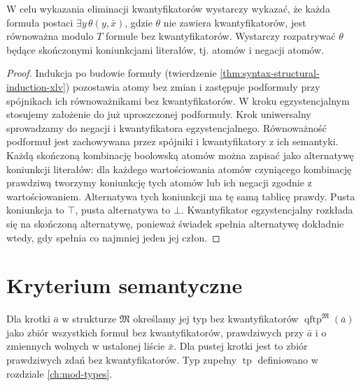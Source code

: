 \begin{lemat}
\label{lem:mod-qe-exists}
W celu wykazania eliminacji kwantyfikatorów wystarczy
wykazać, że każda formuła postaci $\exists y\,\theta(y,\bar x)$,
gdzie $\theta$ nie zawiera kwantyfikatorów, jest równoważna
modulo $T$ formule bez kwantyfikatorów.
Wystarczy rozpatrywać $\theta$ będące skończonymi
koniunkcjami literałów, tj. atomów i negacji atomów.
\end{lemat}
\begin{proof}
Indukcja po budowie formuły (twierdzenie
\ref{thm:syntax-structural-induction-xlv}) pozostawia atomy
bez zmian i zastępuje podformuły przy spójnikach ich
równoważnikami bez kwantyfikatorów. W kroku egzystencjalnym
stosujemy założenie do już uproszczonej podformuły.
Krok uniwersalny sprowadzamy do negacji i kwantyfikatora
egzystencjalnego. Równoważność podformuł jest zachowywana
przez spójniki i kwantyfikatory z ich semantyki.
Każdą skończoną kombinację boolowską atomów można
zapisać jako alternatywę koniunkcji literałów: dla każdego
wartościowania atomów czyniącego kombinację prawdziwą
tworzymy koniunkcję tych atomów lub ich negacji zgodnie
z wartościowaniem. Alternatywa tych koniunkcji ma tę samą
tablicę prawdy. Pusta koniunkcja to $\top$, pusta
alternatywa to $\bot$. Kwantyfikator egzystencjalny
rozkłada się na skończoną alternatywę, ponieważ świadek
spełnia alternatywę dokładnie wtedy, gdy spełnia
co najmniej jeden jej człon.
\end{proof}

\section{Kryterium semantyczne}
\begin{definicja}
\label{def:mod-qe-qftype}
Dla krotki $\bar a$ w strukturze $\mathfrak M$ określamy
jej typ bez kwantyfikatorów
$\operatorname{qftp}^{\mathfrak M}(\bar a)$ jako zbiór
wszystkich formuł bez kwantyfikatorów, prawdziwych przy
$\bar a$ i o zmiennych wolnych w ustalonej liście $\bar x$.
Dla pustej krotki jest to zbiór prawdziwych zdań
bez kwantyfikatorów. Typ zupełny $\operatorname{tp}$
definiowano w rozdziale \ref{ch:mod-types}.
\end{definicja}

